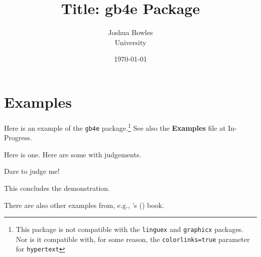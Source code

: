 \documentclass[11pt]{article}
\newcommand{\posscitet}[1]{\citeauthor{#1}'s (\citeyear{#1})}
\begin{document}
\title{Title: gb4e Package}

\author{Joshua Bowles\\
University}



\date{\today}

\maketitle


\section{Examples}
Here is an example of the \texttt{gb4e} package.\footnote{This package is not compatible with the \texttt{linguex} and \texttt{graphicx} packages. Nor is it compatible with, for some reason, the \texttt{colorlinks=true} parameter for \texttt{hypertext}} See also the {\bf Examples} file at {In-Progress}.

\begin{exe} %
\ex\label{here} Here is one. %
\ex Here are some with judgements.
\begin{xlist} %
\ex %
\begin{xlist} %
\end{xlist} %
\ex Dare to judge me!
\end{xlist} %
\ex This concludes the demonstration.
\end{exe}

There are also other examples from, e.g., \posscitet{chomsky81lgb} book.
\newpage
%




 
\end{document}
